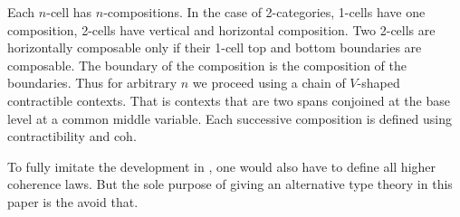 Each $n$-cell has $n$-compositions. In the case of
2-categories, 1-cells have one composition, 2-cells have vertical and
horizontal composition. Two 2-cells are horizontally composable only
if their 1-cell top and bottom boundaries are composable. The boundary
of the composition is the composition of the boundaries.  Thus for
arbitrary $n$ we proceed using a chain of $V$-shaped contractible
contexts. That is contexts that are two spans conjoined at the base
level at a common middle variable. Each successive composition is
defined using contractibility and \textsf{coh}.

To fully imitate the development in \cite{txa:csl}, one would
also have to define all higher coherence laws. But the sole purpose
of giving an alternative type theory in this paper is the avoid that. 
